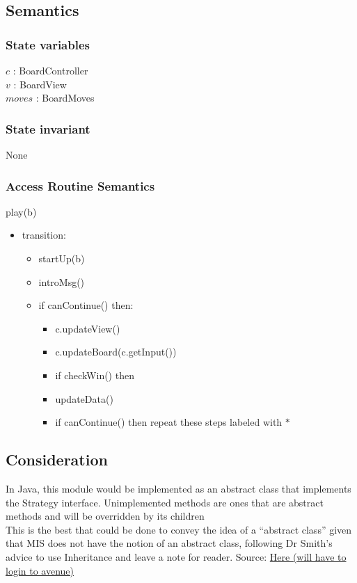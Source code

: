 \documentclass[12pt]{article}
\begin{document}
\subsection* {Semantics}


\subsubsection* {State variables}
\noindent $c$ : BoardController\\
\noindent $v$ : BoardView\\
\noindent $moves$ : BoardMoves\\


\subsubsection*{State invariant}
\noindent None

\subsubsection* {Access Routine Semantics}

\noindent play(b)
\begin{itemize}
\item transition: 
\begin{itemize}
\item startUp(b)
\item introMsg()
\item if canContinue() then:
\begin{itemize}
\item c.updateView()
\item c.updateBoard(c.getInput())
\item if checkWin() then 
\item updateData()
\item if canContinue() then repeat these steps labeled with $*$
\end{itemize} 
\end{itemize}
\end{itemize}

\subsection* {Consideration}
\noindent In Java, this module would be implemented as an abstract class that implements the Strategy interface. Unimplemented methods are ones that are abstract methods and will be overridden by its children\\
\noindent This is the best that could be done to convey the idea of a ``abstract class'' given that MIS does not have the notion of an abstract class, following Dr Smith's advice to use Inheritance and leave a note for reader. Source: \href{https://avenue.cllmcmaster.ca/d2l/le/296632/discussions/threads/1286234/View?groupFilterOption=0&searchText=abstract} {Here (will have to login to avenue)}
\end{document}
